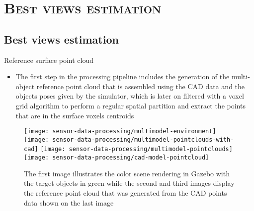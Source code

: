 \section{\scshape Best views estimation}
\subsection*{Best views estimation}

\begin{frame}{Reference surface point cloud}
	\begin{itemize}
		\item The first step in the processing pipeline includes the generation of the multi-object reference point cloud that is assembled using the CAD data and the objects poses given by the simulator, which is later on filtered with a voxel grid algorithm to perform a regular spatial partition and extract the points that are in the surface voxels centroids
	\end{itemize}
	\begin{figure}
		\centering
		\texttt{[image: sensor-data-processing/multimodel-environment]}
		\texttt{[image: sensor-data-processing/multimodel-pointclouds-with-cad]}
		\texttt{[image: sensor-data-processing/multimodel-pointclouds]}
		\texttt{[image: sensor-data-processing/cad-model-pointcloud]}
		\caption{The first image illustrates the color scene rendering in Gazebo with the target objects in green while the second and third images display the reference point cloud that was generated from the CAD points data shown on the last image}
	\end{figure}
\end{frame}

